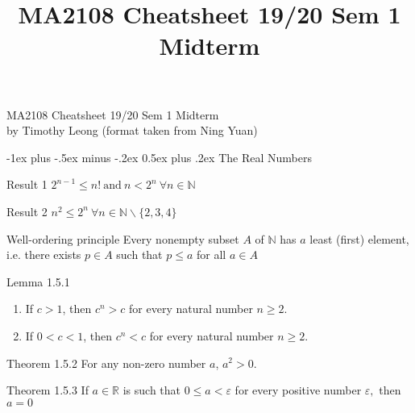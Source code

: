 \documentclass[10pt,landscape]{article}
\title{MA2108 Cheatsheet 19/20 Sem 1 Midterm}
\makeatletter
\renewcommand{\section}{\@startsection{section}{1}{0mm}%
                                {-1ex plus -.5ex minus -.2ex}%
                                {0.5ex plus .2ex}%
                                {\normalfont\large\bfseries}}
\theoremstyle{definition}
\newcommand{\thistheoremname}{}
\newtheorem*{genericthm*}{\thistheoremname}
\newenvironment{namedthm*}[1]
{\renewcommand{\thistheoremname}{#1}\begin{genericthm*}}
{\end{genericthm*}}
\makeatother
\begin{document}
\begin{center}
{\large MA2108 Cheatsheet 19/20 Sem 1 Midterm}\\{by Timothy Leong (format taken from Ning Yuan)}
\end{center}

\raggedright
\footnotesize

\begin{multicols}{3}

\setlength{\premulticols}{1pt}
\setlength{\postmulticols}{1pt}
\setlength{\multicolsep}{1pt}
\setlength{\columnsep}{2pt}

\section{The Real Numbers}

\begin{namedthm*}{Result 1}
    $2^{n-1} \leq n!~ \text{and} ~ n < 2^{n}~\forall n \in \mathbb{N}$
\end{namedthm*}

\begin{namedthm*}{Result 2}
    $n^{2} \leq 2^{n}~\forall n \in \mathbb{N} \backslash \{2,3,4\}$
\end{namedthm*}

\begin{namedthm*}{Well-ordering principle}
  Every nonempty subset $A$ of $\mathbb{N}$ has $a$ least (first) element,
i.e. there exists $p \in A$ such that $p \leq a$ for all $a \in A$
\end{namedthm*}

\begin{namedthm*}{Lemma 1.5.1}
~
    \begin{enumerate}
        \item If $c > 1$, then $c^{n} > c$ for every natural number $n \geq 2$.
        \item If $0 < c < 1$, then $c^{n} < c$ for every natural number $n \geq 2$.
    \end{enumerate}
\end{namedthm*}

\begin{namedthm*}{Theorem 1.5.2}
    For any non-zero number $a$, $a^{2} > 0$.
\end{namedthm*}
\begin{namedthm*}{Theorem 1.5.3}
    If $a \in \mathbb{R}$ is such that $0 \leq a< \varepsilon$ for every positive number $\varepsilon,$ then $a=0$
\end{namedthm*}


\end{multicols}
\end{document}
